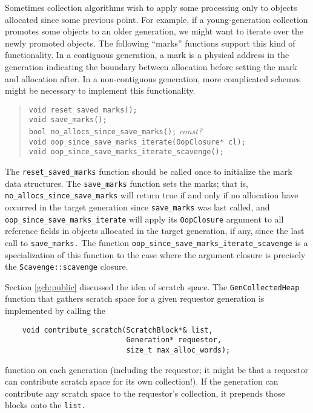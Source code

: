 \documentclass{article}
\begin{document}
Sometimes collection algorithms wish to apply some processing only to
objects allocated since some previous point.  For example, if a
young-generation collection promotes some objects to an older
generation, we might want to iterate over the newly promoted objects.
The following ``marks'' functions support this kind of functionality.
In a contiguous generation, a mark is a physical address in the
generation indicating the boundary between allocation before setting
the mark and allocation after.  In a non-contiguous generation, more
complicated schemes might be necessary to implement this functionality.
\begin{quote}
    {\tt void reset\_saved\_marks();} \\
    {\tt void save\_marks();} \\
    {\tt bool no\_allocs\_since\_save\_marks();} {\em const?} \\
    {\tt void oop\_since\_save\_marks\_iterate(OopClosure* cl);} \\
    {\tt void oop\_since\_save\_marks\_iterate\_scavenge();}
\end{quote}
The {\tt reset\_saved\_marks} function should be called once to
initialize the mark data structures.    The {\tt save\_marks} function sets the
marks; that is, {\tt no\_allocs\_since\_save\_marks} will return true if
and only if no allocation have occurred in the target generation since
{\tt save\_marks} was last called, and {\tt
oop\_since\_save\_marks\_iterate} will apply its {\tt OopClosure} argument
to all reference fields in objects allocated in the target generation,
if any, since the last call to {\tt save\_marks.}  The function
{\tt oop\_since\_save\_marks\_iterate\_scavenge} is a
specialization of this function to the case where the argument closure
is precisely the {\tt Scavenge::scavenge} closure.  

Section \ref{gch:public} discussed the idea of scratch space.  The
{\tt GenCollectedHeap} function that gathers scratch space for a given
requestor generation is implemented by calling the
\begin{verbatim}
    void contribute_scratch(ScratchBlock*& list,
                            Generation* requestor,
                            size_t max_alloc_words);
\end{verbatim}
function on each generation (including the requestor; it might be that a
requestor can contribute scratch space for its own collection!).  If
the generation can contribute any scratch space to the requestor's
collection, it prepends those blocks onto the {\tt list.}
\end{document}
